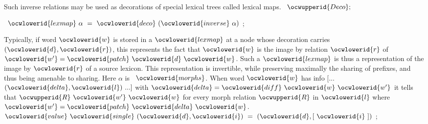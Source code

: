 \documentclass[12pt]{article}
\begin{document}
\ocwendcode{}\ocwindent{0.00em}
Such inverse relations may be used as decorations of special lexical trees
called lexical maps. 
\ocweol
\label{../ML/lexmap.ml:924}%
\medskip
\ocwbegincode{}\ocwindent{0.00em}
~$\ocwupperid{Deco};$\medskip

\label{../ML/lexmap.ml:936}%
\ocwindent{0.00em}
~$\ocwlowerid{lexmap}~\alpha{}~=~\ocwlowerid{deco}~(\ocwlowerid{inverse}~\alpha{})$\ocweol
\ocwindent{0.00em}
;\medskip

\ocwendcode{}\ocwindent{0.00em}
Typically, if word \ocwbegindcode{}$\ocwlowerid{w}$\ocwenddcode{} is stored in a \ocwbegindcode{}$\ocwlowerid{lexmap}$\ocwenddcode{} at a node whose decoration
carries \ocwbegindcode{}$(\ocwlowerid{d},\ocwlowerid{r})$\ocwenddcode{}, this represents the fact that \ocwbegindcode{}$\ocwlowerid{w}$\ocwenddcode{} is the image by relation 
\ocwbegindcode{}$\ocwlowerid{r}$\ocwenddcode{} of \ocwbegindcode{}$\ocwlowerid{w'}=\ocwlowerid{patch}~\ocwlowerid{d}~\ocwlowerid{w}$\ocwenddcode{}. Such a \ocwbegindcode{}$\ocwlowerid{lexmap}$\ocwenddcode{} is thus a representation of the image 
by \ocwbegindcode{}$\ocwlowerid{r}$\ocwenddcode{} of a source lexicon. This representation is invertible, while preserving
maximally the sharing of prefixes, and thus being amenable to sharing. 
\ocweol
\ocwindent{0.00em}
Here \ocwbegindcode{}$\alpha{}$\ocwenddcode{} is \ocwbegindcode{}~$\ocwlowerid{morphs}$\ocwenddcode{}. When word \ocwbegindcode{}$\ocwlowerid{w}$\ocwenddcode{} has info \ocwbegindcode{}[...~$(\ocwlowerid{delta},\ocwlowerid{l})~...]$\ocwenddcode{} 
with \ocwbegindcode{}$\ocwlowerid{delta}=\ocwlowerid{diff}~\ocwlowerid{w}~\ocwlowerid{w'}$\ocwenddcode{} it tells that \ocwbegindcode{}$\ocwupperid{R}~\ocwlowerid{w'}~\ocwlowerid{w}$\ocwenddcode{} for every morph relation \ocwbegindcode{}$\ocwupperid{R}$\ocwenddcode{} 
in \ocwbegindcode{}$\ocwlowerid{l}$\ocwenddcode{} where \ocwbegindcode{}$\ocwlowerid{w'}=\ocwlowerid{patch}~\ocwlowerid{delta}~\ocwlowerid{w}$\ocwenddcode{}. 
\ocweol
\label{../ML/lexmap.ml:1551}%
\medskip
\ocwbegincode{}\ocwindent{0.00em}
$\ocwlowerid{value}~\ocwlowerid{single}~(\ocwlowerid{d},\ocwlowerid{i})~=~(\ocwlowerid{d},[~\ocwlowerid{i}~])$\ocweol
\ocwindent{0.00em}
;\medskip
\end{document}
